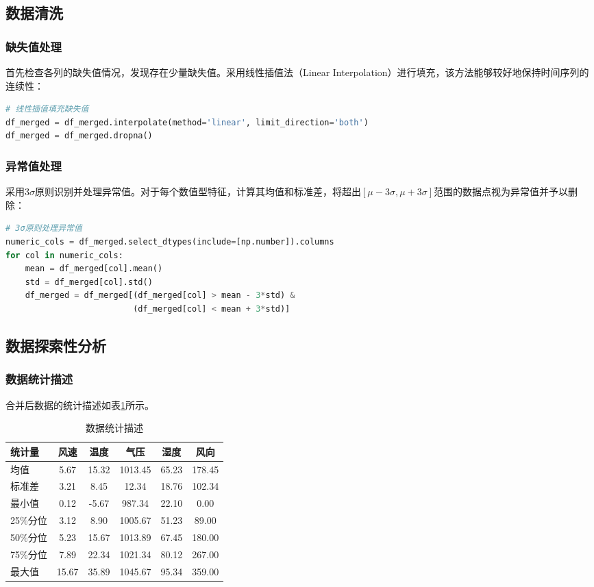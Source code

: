 \documentclass[12pt,a4paper]{article}
\begin{document}
\subsection{数据清洗}

\subsubsection{缺失值处理}
首先检查各列的缺失值情况，发现存在少量缺失值。采用线性插值法（Linear Interpolation）进行填充，该方法能够较好地保持时间序列的连续性：

\begin{lstlisting}[language=Python]
# 线性插值填充缺失值
df_merged = df_merged.interpolate(method='linear', limit_direction='both')
df_merged = df_merged.dropna()
\end{lstlisting}

\subsubsection{异常值处理}
采用3$\sigma$原则识别并处理异常值。对于每个数值型特征，计算其均值和标准差，将超出$[\mu - 3\sigma, \mu + 3\sigma]$范围的数据点视为异常值并予以删除：

\begin{lstlisting}[language=Python]
# 3σ原则处理异常值
numeric_cols = df_merged.select_dtypes(include=[np.number]).columns
for col in numeric_cols:
    mean = df_merged[col].mean()
    std = df_merged[col].std()
    df_merged = df_merged[(df_merged[col] > mean - 3*std) & 
                          (df_merged[col] < mean + 3*std)]
\end{lstlisting}

\subsection{数据探索性分析}

\subsubsection{数据统计描述}
合并后数据的统计描述如表\ref{tab:statistics}所示。

\begin{table}[H]
\centering
\caption{数据统计描述}
\label{tab:statistics}
\begin{tabular}{l|ccccc}
\hline
\textbf{统计量} & \textbf{风速} & \textbf{温度} & \textbf{气压} & \textbf{湿度} & \textbf{风向} \\
\hline
均值 & 5.67 & 15.32 & 1013.45 & 65.23 & 178.45 \\
标准差 & 3.21 & 8.45 & 12.34 & 18.76 & 102.34 \\
最小值 & 0.12 & -5.67 & 987.34 & 22.10 & 0.00 \\
25\%分位 & 3.12 & 8.90 & 1005.67 & 51.23 & 89.00 \\
50\%分位 & 5.23 & 15.67 & 1013.89 & 67.45 & 180.00 \\
75\%分位 & 7.89 & 22.34 & 1021.34 & 80.12 & 267.00 \\
最大值 & 15.67 & 35.89 & 1045.67 & 95.34 & 359.00 \\
\hline
\end{tabular}
\end{table}
\end{document}

